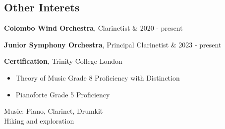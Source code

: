 \documentclass[10pt, a4paper]{article}
\newenvironment{highlights}{
        \begin{itemize}[
                topsep=0pt,
                parsep=0.10 cm,
                partopsep=0pt,
                itemsep=0pt,
                after=\vspace{-1\baselineskip},
                leftmargin=0.4 cm + 3pt
            ]
    }{
        \end{itemize}
    } %
\let\originalTabularx\tabularx
\let\originalEndTabularx\endtabularx
\renewenvironment{tabularx}{\bgroup\centering\originalTabularx}{\originalEndTabularx\par\egroup}
\begin{document}
\subsection{Other Interets}
	\begin{tabularx}{\textwidth-0.4 cm-0.13cm}{K{0.2 cm} R{4.1 cm}}
            \textbf{Colombo Wind Orchestra}, Clarinetist
            &
            2020 - present
     \end{tabularx}
     \vspace{0.2 cm}
	\begin{tabularx}{\textwidth-0.4 cm-0.13cm}{K{0.2 cm} R{4.1 cm}}
            \textbf{Junior Symphony Orchestra}, Principal Clarinetist
            &
            2023 - present
     \end{tabularx}
     \vspace{0.2 cm}
	\begin{tabularx}{\textwidth-0.4 cm-0.13cm}{K{0.2 cm} R{4.1 cm}}
            \textbf{Certification}, Trinity College London
			\begin{highlights}
	       	 \item Theory of Music Grade 8 Proficiency with Distinction
			\item Pianoforte Grade 5 Proficiency
	        \end{highlights}
     \end{tabularx}
     
     \vspace{0.2 cm}
     Music: Piano, Clarinet, Drumkit \\
     Hiking and exploration
\end{document}
